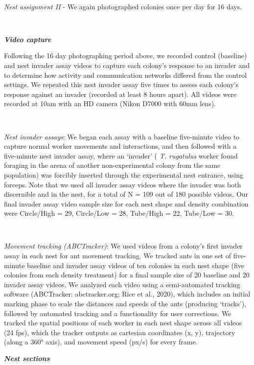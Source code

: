 \documentclass[3p]{elsarticle} %
\begin{document}
~

\emph{Nest assignment II} - We again photographed colonies once per day
for 16 days.

~

\textbf{\emph{Video capture}}

Following the 16 day photographing period above, we recorded control
(baseline) and nest invader assay videos to capture each colony's
response to an invader and to determine how activity and communication
networks differed from the control settings. We repeated this nest
invader assay five times to assess each colony's response against an
invader (recorded at least 8 hours apart). All videos were recorded at
10am with an HD camera (Nikon D7000 with 60mm lens).

~

\emph{Nest invader assays}: We began each assay with a baseline
five-minute video to capture normal worker movements and interactions,
and then followed with a five-minute nest invader assay, where an
`invader' ( \emph{T. rugatulus} worker found foraging in the arena of
another non-experimental colony from the same population) was forcibly
inserted through the experimental nest entrance, using forceps. Note
that we used all invader assay videos where the invader was both
discernible and in the nest, for a total of N = 109 out of 180 possible
videos. Our final invader assay video sample size for each nest shape
and density combination were Circle/High = 29, Circle/Low = 28,
Tube/High = 22, Tube/Low = 30.

~

\emph{Movement tracking (ABCTracker)}: We used videos from a colony's
first invader assay in each nest for ant movement tracking. We tracked
ants in one set of five-minute baseline and invader assay videos of ten
colonies in each nest shape (five colonies from each density treatment)
for a final sample size of 20 baseline and 20 invader assay videos. We
analyzed each video using a semi-automated tracking software
(ABCTracker: abctracker.org; Rice et al., 2020), which includes an
initial marking phase to scale the distances and speeds of the ants
(producing `tracks'), followed by automated tracking and a functionality
for user corrections. We tracked the spatial positions of each worker in
each nest shape across all videos (24 fps), which the tracker outputs as
cartesian coordinates (x, y), trajectory (along a 360° axis), and
movement speed (px/s) for every frame.

\textbf{\emph{Nest sections}}
\end{document}
